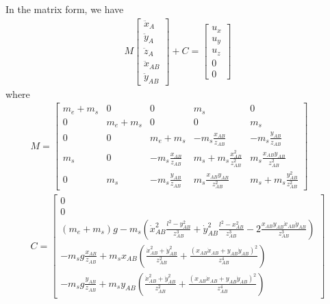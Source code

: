 \documentclass{article}
\begin{document}
In the matrix form, we have
\begin{align}
	M	\begin{bmatrix}\ddot{x}_A\\\ddot{y}_A\\\ddot{z}_A\\\ddot{x}_{AB}\\\ddot{y}_{AB}\end{bmatrix} + C = \begin{bmatrix}u_x\\u_y\\u_z\\0\\0\end{bmatrix}
\end{align}
where
\begin{align}
	M = 
	\begin{bmatrix}
		m_e + m_s & 0 & 0 & m_s & 0\\
		0 & m_e + m_s & 0 & 0 & m_s\\
		0 & 0 & m_e + m_s & -m_s\frac{x_{AB}}{z_{AB}} & -m_s\frac{y_{AB}}{z_{AB}}\\
		m_s& 0 & -m_s\frac{x_{AB}}{z_{AB}} & m_s + m_s\frac{x_{AB}^2}{z_{AB}^2} & m_s\frac{x_{AB}y_{AB}}{z_{AB}^2}\\
		0 & m_s & -m_s\frac{y_{AB}}{z_{AB}} &m_s\frac{x_{AB}y_{AB}}{z_{AB}^2} & m_s + m_s\frac{y_{AB}^2}{z_{AB}^2}
	\end{bmatrix}\\
	C = \begin{bmatrix}
		0\\
		0\\
		(m_e + m_s)g - m_s\left(\dot{x}_{AB}^2\frac{l^2-y_{AB}^2}{z_{AB}^3} + \dot{y}_{AB}^2\frac{l^2-x_{AB}^2}{z_{AB}^3} - 2\frac{x_{AB}y_{AB}\dot{x}_{AB}\dot{y}_{AB}}{z_{AB}^3}\right)\\
		-m_sg\frac{x_{AB}}{z_{AB}}+m_sx_{AB}\left(\frac{\dot{x}_{AB}^2 + \dot{y}_{AB}^2}{z_{AB}^2}+\frac{(x_{AB}\dot{x}_{AB} + y_{AB}\dot{y}_{AB})^2}{z_{AB}^4}\right)\\
		-m_sg\frac{y_{AB}}{z_{AB}}+m_sy_{AB}\left(\frac{\dot{x}_{AB}^2 + \dot{y}_{AB}^2}{z_{AB}^2}+\frac{(x_{AB}\dot{x}_{AB} + y_{AB}\dot{y}_{AB})^2}{z_{AB}^4}\right)
	\end{bmatrix}
\end{align}
\end{document}
